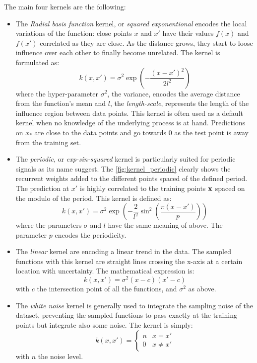 The main four kernels are the following:
\begin{itemize}
	\item The \emph{Radial basis function} kernel, or \emph{squared exponentional} encodes the local variations of the function: close points $x$ and $x'$ have their values $f(x)$ and $f(x')$ correlated as they are close. As the distance grows, they start to loose influence over each other to finally become unrelated. The kernel is formulated as:
		\begin{equation}
		k(x, x') = \sigma^{2}\exp\left(- \frac{(x - x')^{2}}{2l^2} \right)
		\end{equation} where the hyper-parameter $\sigma^2$, the variance, encodes the average distance from the function's mean and $l$, the \emph{length-scale}, represents the length of the influence region between data points. This kernel is often used as a default kernel when no knowledge of the underlying process is at hand. Predictions on $x_\ast$ are close to the data points and go towards 0 as the test point is away from the training set.
	\item The \emph{periodic}, or \emph{exp-sin-squared} kernel is particularly suited for periodic signals as its name suggest. The \cref{fig:kernel_periodic} clearly shows the recurrent weights added to the different points spaced of the defined period. The prediction at $x'$ is highly correlated to the training points $\boldsymbol{\mathbf{x}}$ spaced on the modulo of the period. This kernel is defined as:
		\begin{equation}
		k(x, x') = \sigma^{2}\exp\left(-\frac{2}{l^2} \sin^2 \left( \frac{\pi(x-x')}{p}\right) \right )
		\end{equation} where the parameters $\sigma$ and $l$ have the same meaning of above. The parameter $p$ encodes the periodicity.
	\item The \emph{linear} kernel are encoding a linear trend in the data. The sampled functions with this kernel are straight lines crossing the x-axis at a certain location with uncertainty. The mathematical expression is:
		\begin{equation}
			k(x, x') = \sigma^{2}(x-c)(x'-c)
		\end{equation} with $c$ the intersection point of all the functions, and $\sigma^2$ as above.
	\item The \emph{white noise} kernel is generally used to integrate the sampling noise of the dataset, preventing the sampled functions to pass exactly at the training points but integrate also some noise. The kernel is simply:
		\begin{equation}
			k(x, x') =  \left\{\begin{matrix}
        n & x = x'\\ 
        0 & x \neq x'
        \end{matrix}\right.
		\end{equation} with $n$ the noise level.
\end{itemize}

